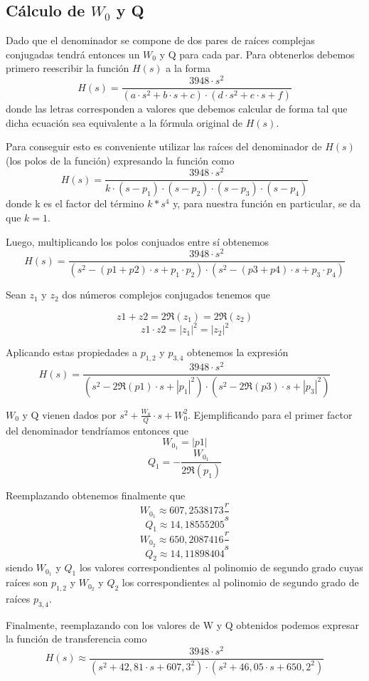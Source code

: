\documentclass[11pt,a4paper]{report}
\begin{document}
\subsection*{Cálculo de $W_{0}$ y Q}

Dado que el denominador se compone de dos pares de raíces complejas conjugadas tendrá entonces un $W_{0}$ y Q para cada par. Para obtenerlos debemos primero reescribir la función $H(s)$ a la forma
\[H(s)=\frac{3948 \cdot s^2}{(a \cdot s^2+b \cdot s+c) \cdot (d \cdot s^2+e \cdot s+f)}\]
donde las letras corresponden a valores que debemos calcular de forma tal que dicha
ecuación sea equivalente a la fórmula original de $H(s)$.

\bigskip
Para conseguir esto es conveniente utilizar las raíces del denominador de $H(s)$ (los polos de la función) expresando la función como
\[H(s)=\frac{3948 \cdot s^2}{k \cdot (s-p_{1}) \cdot (s-p_{2}) \cdot (s-p_{3}) \cdot (s-p_{4})}\]
donde k es el factor del término $k*s^4$ y, para nuestra función en particular,
se da que $k=1$. 

\bigskip
Luego, multiplicando los polos conjuados entre sí obtenemos
\[H(s)=\frac{3948 \cdot s^2}{(s^2-(p1+p2) \cdot s+p_{1} \cdot p_{2}) \cdot (s^2-(p3+p4) \cdot s+p_{3} \cdot p_{4})}\]

\bigskip
Sean $z_{1}$ y $z_{2}$ dos números complejos conjugados tenemos que 

\[z1+z2=2\Re(z_{1}) = 2\Re(z_{2})\] 
\[z1 \cdot z2=|z_{1}|^2=|z_{2}|^2\] 

Aplicando estas propiedades a $p_{1,2}$ y 
$p_{3,4}$ obtenemos la expresión
\[H(s)=\frac{3948 \cdot s^2}{(s^2-2\Re(p1) \cdot s+|p_{1}|^2) \cdot (s^2-2\Re(p3) \cdot s+|p_{3}|^2)}\]

\bigskip
$W_{0}$ y Q vienen dados por $s^2+\frac{W_{0}}{Q} \cdot s + W_{0}^2$. Ejemplificando para el primer factor del denominador tendríamos entonces que 
\[W_{0_{1}} = |p1|\]
\[Q_{1} = -\frac{W_{0_{1}}}{2\Re(p_{1})}\]

\bigskip
Reemplazando obtenemos finalmente que
\[W_{0_{1}} \approx 607,2538173 \frac{r}{s}\]
\[Q_{1} \approx 14,18555205\]
\[W_{0_{2}} \approx 650,2087416 \frac{r}{s}\]
\[Q_{2} \approx 14,11898404\]
siendo $W_{0_{1}}$ y $Q_{1}$ los valores correspondientes al polinomio de segundo 
grado cuyas raíces son $p_{1,2}$ y $W_{0_{2}}$ y $Q_{2}$ los correspondientes
al polinomio de segundo grado de raíces $p_{3,4}$.

\bigskip
Finalmente, reemplazando con los valores de W y Q obtenidos podemos expresar la función de transferencia como
\[H(s) \approx \frac{3948 \cdot s^2}{(s^2+42,81 \cdot s + 607,3^2)
\cdot (s^2+46,05 \cdot s + 650,2^2)}\]
\end{document}
